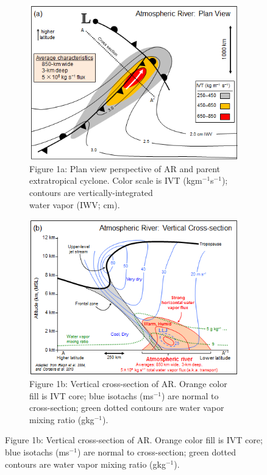 \documentclass[letterpaper,12pt]{article}
\begin{document}
\begin{figure}[h]
\centering
\begin{subfigure}{.5\textwidth}
  \includegraphics[width=0.8\linewidth]{Atmospheric_river_fig1a.png}
  \caption{Figure 1a: Plan view perspective of AR and parent extratropical cyclone. Color scale is IVT (kgm$^{-1}$s$^{-1}$); contours are vertically-integrated \\ water vapor (IWV; cm).}\label{AR1a}

\end{subfigure}%
\begin{subfigure}{0.5\textwidth}
  \centering
  \includegraphics[width=0.8\linewidth]{Atmospheric_river_fig1b.png}
    \caption{Figure 1b: Vertical cross-section of AR. Orange color fill is IVT core; blue isotachs (ms$^{-1}$) are normal to cross-section; green dotted contours are water vapor mixing ratio (gkg$^{-1}$).\\}\label{AR1b}
\end{subfigure}
\end{figure}
\end{document}
